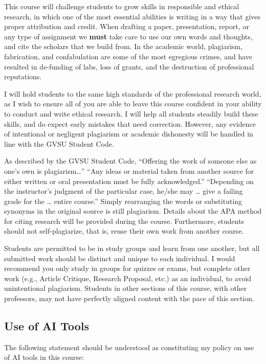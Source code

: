 \documentclass[
  12pt,
  letterpaper,
]{scrartcl}
\begin{document}
This course will challenge students to grow skills in responsible and
ethical research, in which one of the most essential abilities is
writing in a way that gives proper attribution and credit. When drafting
a paper, presentation, report, or any type of assignment we
\textbf{must} take care to use our own words and thoughts, and cite the
scholars that we build from. In the academic world, plagiarism,
fabrication, and confabulation are some of the most egregious crimes,
and have resulted in de-funding of labs, loss of grants, and the
destruction of professional reputations.

I will hold students to the same high standards of the professional
research world, as I wish to ensure all of you are able to leave this
course confident in your ability to conduct and write ethical research.
I will help all students steadily build these skills, and do expect
early mistakes that need correction. However, any evidence of
intentional or negligent plagiarism or academic dishonesty will be
handled in line with the GVSU Student Code.

As described by the GVSU Student Code, ``Offering the work of someone
else as one's own is plagiarism\ldots{}'' ``Any ideas or material taken
from another source for either written or oral presentation must be
fully acknowledged.'' ``Depending on the instructor's judgment of the
particular case, he/she may \ldots{} give a failing grade for the
\ldots{} entire course.'' Simply rearranging the words or substituting
synonyms in the original source is still plagiarism. Details about the
APA method for citing research will be provided during the course.
Furthermore, students should not self-plagiarize, that is, reuse their
own work from another course.

Students are permitted to be in study groups and learn from one another,
but all submitted work should be distinct and unique to each individual.
I would recommend you only study in groups for quizzes or exams, but
complete other work (e.g., Article Critique, Research Proposal, etc.) as
an individual, to avoid unintentional plagiarism. Students in other
sections of this course, with other professors, may not have perfectly
aligned content with the pace of this section.

\subsection{Use of AI Tools}\label{use-of-ai-tools}

The following statement should be understood as constituting my policy
on use of AI tools in this course:
\end{document}
